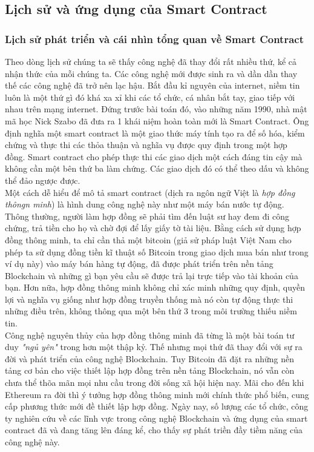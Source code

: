 \subsection{Lịch sử và ứng dụng của Smart Contract}
\subsubsection{Lịch sử phát triển và cái nhìn tổng quan về Smart Contract}
Theo dòng lịch sử chúng ta sẽ thấy công nghệ đã thay đổi rất nhiều thứ, kể cả nhận thức của mỗi chúng ta. Các công nghệ mới được sinh ra và dần dần thay thế các công nghệ đã trở nên lạc hậu. Bắt đầu kỉ nguyên của internet, niềm tin luôn là một thứ gì đó khá xa xỉ khi các tổ chức, cá nhân bắt tay, giao tiếp với nhau trên mạng internet. Đứng trước bài toán đó, vào những năm 1990, nhà mật mã học Nick Szabo đã đưa ra 1 khái niệm hoàn toàn mới là Smart Contract. Ông định nghĩa một smart contract là một giao thức máy tính tạo ra để số hóa, kiểm chứng và thực thi các thỏa thuận và nghĩa vụ được quy định trong một hợp đồng. Smart contract cho phép thực thi các giao dịch một cách đáng tin cậy mà không cần một bên thứ ba làm chứng. Các giao dịch đó có thể theo dấu và không thể đảo ngược được.\\

Một cách dễ hiểu để mô tả smart contract (dịch ra ngôn ngữ Việt là \textit{hợp đồng thôngn minh}) là hình dung công nghệ này như một máy bán nước tự động. Thông thường, người làm hợp đồng sẽ phải tìm đến luật sư hay đem đi công chứng, trả tiền cho họ và chờ đợi để lấy giấy tờ tài liệu. Bằng cách sử dụng hợp đồng thông minh, ta chỉ cần thả một bitcoin (giả sử pháp luật Việt Nam cho phép ta sử dụng đồng tiền kĩ thuật số Bitcoin trong giao dịch mua bán như trong ví dụ này) vào máy bán hàng tự động, đã được phát triển trên nền tảng Blockchain và những gì bạn yêu cầu sẽ được trả lại trực tiếp vào tài khoản của bạn. Hơn nữa, hợp đồng thông minh không chỉ xác minh những quy định, quyền lợi và nghĩa vụ giống như hợp đồng truyền thống mà nó còn tự động thực thi những điều trên, không thông qua một bên thứ 3 trong môi trường thiếu niềm tin.\\

Công nghệ nguyên thủy của hợp đồng thông minh đã từng là một bài toán tư duy \textit{"ngủ yên"} trong hơn một thập kỷ. Thế nhưng mọi thứ đã thay đổi với sự ra đời và phát triển của công nghệ Blockchain. Tuy Bitcoin đã đặt ra những nền tảng cơ bản cho việc thiết lập hợp đồng trên nền tảng Blockchain, nó vẫn còn chưa thể thõa mãn mọi nhu cầu trong đời sống xã hội hiện nay. Mãi cho đến khi Ethereum ra đời thì ý tưởng hợp đồng thông minh mới chính thức phổ biến, cung cấp phương thức mới đề thiết lập hợp đồng. Ngày nay, số lượng các tổ chức, công ty nghiên cứu về các lĩnh vực trong công nghệ Blockchain và ứng dụng của smart contract đã và đang tăng lên đáng kể, cho thấy sự phát triền đầy tiềm năng của công nghệ này.\\

